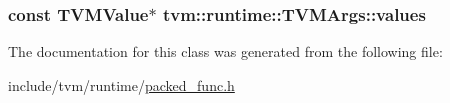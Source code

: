 \subsubsection[{\texorpdfstring{values}{values}}]{\setlength{\rightskip}{0pt plus 5cm}const {\bf T\+V\+M\+Value}$\ast$ tvm\+::runtime\+::\+T\+V\+M\+Args\+::values}\hypertarget{classtvm_1_1runtime_1_1TVMArgs_a3b99059e2f1ad08c99b42b5bee82752f}{}\label{classtvm_1_1runtime_1_1TVMArgs_a3b99059e2f1ad08c99b42b5bee82752f}


The documentation for this class was generated from the following file\+:\begin{DoxyCompactItemize}
\item 
include/tvm/runtime/\hyperlink{packed__func_8h}{packed\+\_\+func.\+h}\end{DoxyCompactItemize}
